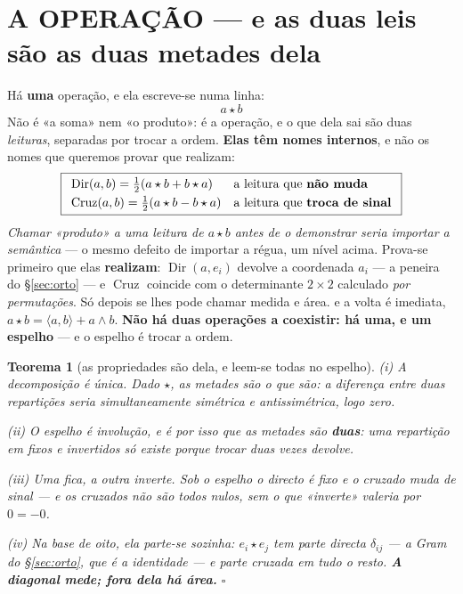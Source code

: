\documentclass[11pt,a4paper]{article}
\newtheorem{teorema}{Teorema}
\begin{document}
\section{A OPERAÇÃO --- e as duas leis são as duas metades dela}\label{sec:operacao}

\noindent Há \textbf{uma} operação, e ela escreve-se numa linha:
\[
\boxed{\;a\star b\;}
\]
Não é «a soma» nem «o produto»: é a operação, e o que dela sai são duas
\emph{leituras}, separadas por trocar a ordem. \textbf{Elas têm nomes internos}, e não os
nomes que queremos provar que realizam:
\[
\boxed{
\begin{array}{lll}
\operatorname{Dir}(a,b)=\tfrac12(a\star b+b\star a) & \text{a leitura que \textbf{não
muda}}\\[3pt]
\operatorname{Cruz}(a,b)=\tfrac12(a\star b-b\star a) & \text{a leitura que \textbf{troca
de sinal}}
\end{array}}
\]
\emph{Chamar «produto» a uma leitura de $a\star b$ antes de o demonstrar seria importar a
semântica} --- o mesmo defeito de importar a régua, um nível acima. Prova-se primeiro que
elas \textbf{realizam}: $\operatorname{Dir}(a,e_i)$ devolve a coordenada $a_i$ --- a
peneira do \S\ref{sec:orto} --- e $\operatorname{Cruz}$ coincide com o determinante $2\times2$
calculado \emph{por permutações}. Só depois se lhes pode chamar medida e área.
e a volta é imediata, $a\star b=\langle a,b\rangle+a\wedge b$. \textbf{Não há duas
operações a coexistir: há uma, e um espelho} --- e o espelho é trocar a ordem.

\begin{teorema}[as propriedades são dela, e leem-se todas no espelho]\label{thm:operacao}
\emph{(i) A decomposição é única.} Dado $\star$, as metades são o que são: a diferença
entre duas repartições seria simultaneamente simétrica e antissimétrica, logo \emph{zero}.

\emph{(ii) O espelho é involução}, e é por isso que as metades são \textbf{duas}: uma
repartição em fixos e invertidos só existe porque trocar duas vezes devolve.

\emph{(iii) Uma fica, a outra inverte.} Sob o espelho o directo é fixo e o cruzado muda de
sinal --- e os cruzados não são todos nulos, sem o que «inverte» valeria por $0=-0$.

\emph{(iv) Na base de oito, ela parte-se sozinha}: $e_i\star e_j$ tem parte directa
$\delta_{ij}$ --- a Gram do \S\ref{sec:orto}, que é a identidade --- e parte cruzada em
tudo o resto. \textbf{A diagonal mede; fora dela há área.} $\square$
\end{teorema}
\end{document}

